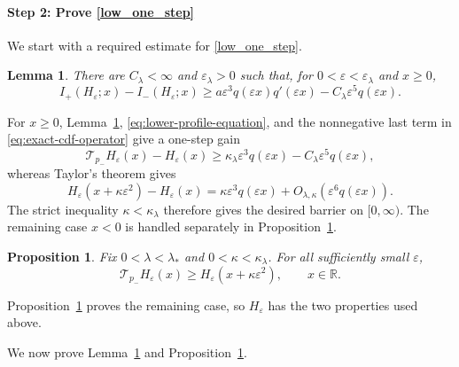 \documentclass[12pt,preprint]{amsart}
\numberwithin{equation}{section}
\theoremstyle{plain}
\newtheorem{proposition}[theorem]{Proposition}
\newtheorem{lemma}[theorem]{Lemma}
\theoremstyle{definition}
\begin{document}
\paragraph*{Step 2: Prove \eqref{low_one_step}}
We start with a required  estimate for \eqref{low_one_step}.

\begin{lemma}
\label{lem:hard-edge-consistency}
There are $C_{\lambda}<\infty$ and $\varepsilon_{\lambda}>0$ such that, for
$0<\varepsilon<\varepsilon_{\lambda}$ and $x\ge0$,
\begin{equation}
 I_+(H_\varepsilon;x)-I_-(H_\varepsilon;x)
 \ge a\varepsilon^3q(\varepsilon x)q'(\varepsilon x)
      -C_{\lambda}\varepsilon^5q(\varepsilon x).
 \label{eq:hard-edge-one-sided-consistency}
\end{equation}
\end{lemma}

For $x\ge0$, Lemma~\ref{lem:hard-edge-consistency},
\eqref{eq:lower-profile-equation}, and the nonnegative last term in
\eqref{eq:exact-cdf-operator} give a one-step gain
\[
 \mathcal T_{p_-}H_\varepsilon(x)-H_\varepsilon(x)
 \ge \kappa_{\lambda}\varepsilon^3q(\varepsilon x)
      -C_{\lambda}\varepsilon^5q(\varepsilon x),
\]
whereas Taylor's theorem gives
\[
 H_\varepsilon(x+\kappa\varepsilon^2)-H_\varepsilon(x)
 =\kappa\varepsilon^3q(\varepsilon x)
  +O_{\lambda,\kappa}(\varepsilon^6q(\varepsilon x)).
\]
The strict inequality $\kappa<\kappa_{\lambda}$ therefore gives the desired
barrier on $[0,\infty)$. The remaining case $x<0$ is handled separately in
Proposition~\ref{prop:hard-edge-barrier}.

\begin{proposition}
\label{prop:hard-edge-barrier}
Fix $0<\lambda<\lambda_*$ and $0<\kappa<\kappa_{\lambda}$.  For all sufficiently small
$\varepsilon$,
\begin{equation*}
 \mathcal T_{p_-}H_\varepsilon(x)
 \ge H_\varepsilon(x+\kappa\varepsilon^2),
 \qquad x\in\mathbb R.
\end{equation*}
\end{proposition}

Proposition~\ref{prop:hard-edge-barrier} proves the remaining case, so $H_\varepsilon$ has the two properties used above.

We now prove Lemma~\ref{lem:hard-edge-consistency} and Proposition~\ref{prop:hard-edge-barrier}.
\end{document}
